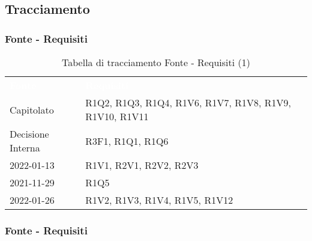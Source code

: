 \subsection{Tracciamento}

\subsubsection{Fonte - Requisiti}


\begin{table}[!htbp]
\renewcommand{\arraystretch}{1.5}
\begin{tabular}{ m{}<{\centering}  m{}<{\centering} }
	\rowcolor{darkblue}
	\textcolor{white}{\textbf{Fonte}} &\textcolor{white}{\textbf{Requisiti}}\\ 

	Capitolato & R1Q2, R1Q3, R1Q4, R1V6, R1V7, R1V8, R1V9, R1V10, R1V11\\	

	Decisione Interna & R3F1, R1Q1, R1Q6 \\
	
	\Vi{} 2022-01-13 & R1V1, R2V1, R2V2, R2V3 \\
	
	\Vi{} 2021-11-29 & R1Q5 \\
	
	\Ve{} 2022-01-26 & R1V2, R1V3, R1V4, R1V5, R1V12 \\

\end{tabular}
\caption{Tabella di tracciamento Fonte - Requisiti (1)}
\end{table}

\pagebreak
\subsubsection{Fonte - Requisiti}

